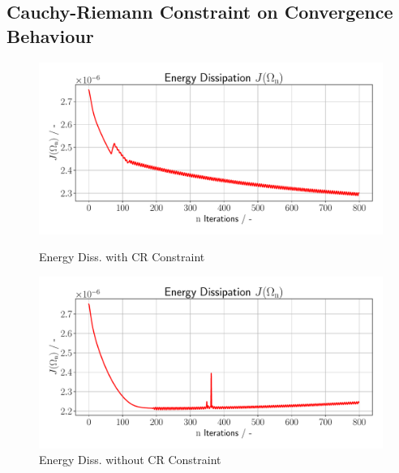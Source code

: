\pagebreak

\subsection{Cauchy-Riemann Constraint on Convergence Behaviour}
\begin{figure}[h]
    \begin{minipage}{.5\textwidth}
        \centering
        \includegraphics[width=1\textwidth]{figures/energy_diss_plot.pdf}
        \caption{Energy Diss. with CR Constraint}
        \label{plot_ref_energy_diss_good}
    \end{minipage}
    \begin{minipage}{.5\textwidth}
        \centering
        \includegraphics[width=1\textwidth]{figures/energy_diss_plot_bad.pdf}
        \caption{Energy Diss. without CR Constraint}
        \label{plot_ref_energy_diss_bad}
    \end{minipage}
\end{figure}
